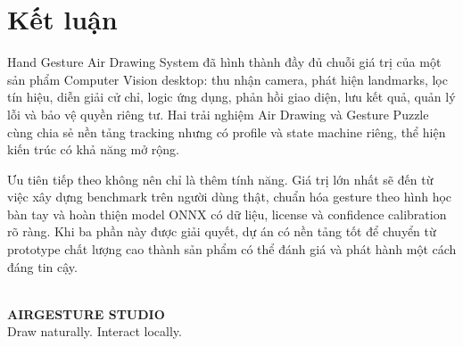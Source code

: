\documentclass[12pt,a4paper,oneside]{report}
\begin{document}
\chapter*{Kết luận}

Hand Gesture Air Drawing System đã hình thành đầy đủ chuỗi giá trị của một sản phẩm Computer Vision desktop: thu nhận camera, phát hiện landmarks, lọc tín hiệu, diễn giải cử chỉ, logic ứng dụng, phản hồi giao diện, lưu kết quả, quản lý lỗi và bảo vệ quyền riêng tư. Hai trải nghiệm Air Drawing và Gesture Puzzle cùng chia sẻ nền tảng tracking nhưng có profile và state machine riêng, thể hiện kiến trúc có khả năng mở rộng.

Ưu tiên tiếp theo không nên chỉ là thêm tính năng. Giá trị lớn nhất sẽ đến từ việc xây dựng benchmark trên người dùng thật, chuẩn hóa gesture theo hình học bàn tay và hoàn thiện model ONNX có dữ liệu, license và confidence calibration rõ ràng. Khi ba phần này được giải quyết, dự án có nền tảng tốt để chuyển từ prototype chất lượng cao thành sản phẩm có thể đánh giá và phát hành một cách đáng tin cậy.

\vfill
\begin{center}
\\[3mm]
{\sffamily\bfseries\color{Forest}AIRGESTURE STUDIO}\\
{\small\color{Slate}Draw naturally. Interact locally.}
\end{center}
\end{document}
